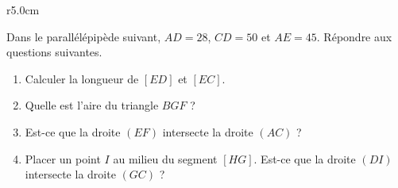 
\begin{exercice}[\ldots/4]\label{exosmath-0698}

\begin{wrapfigure}{r}{5.0cm}
   \vspace{-0.5cm}        %
   \centering
   
\end{wrapfigure}

    Dans le parallélépipède suivant, \( AD=28\), \( CD=50\) et \( AE=45\). Répondre aux questions suivantes.

\begin{enumerate}
    \item
        Calculer la longueur de \(  [ED]\) et \( [EC]\).
    \item
        Quelle est l'aire du triangle \( BGF\) ?
    \item
        Est-ce que la droite \( (EF)\) intersecte la droite \( (AC)\) ?
    \item
        Placer un point \( I\) au milieu du segment \( [HG]\). Est-ce que la droite \( (DI)\) intersecte la droite \( (GC)\) ?
\end{enumerate}


\end{exercice}
